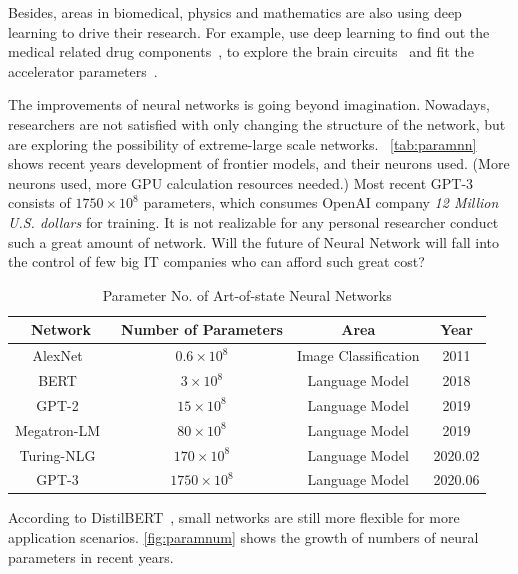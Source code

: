 \begin{spacing}{1.5}
Besides, areas in biomedical, physics and mathematics are also using deep learning to drive their research. For example, use deep learning to find out the medical related drug components~\cite{ma2015deep}, to explore the brain circuits~\cite{helmstaedter2013connectomic} and fit the accelerator parameters~\cite{ciodaro2012online}.

The improvements of neural networks is going beyond imagination. Nowadays, researchers are not satisfied with only changing the structure of the network, but are exploring the possibility of extreme-large scale networks. ~\autoref{tab:paramnn} shows recent years development of frontier models, and their neurons used. (More neurons used, more GPU calculation resources needed.) Most recent GPT-3 consists of $1750 \times {10}^8$ parameters, which consumes OpenAI company \textit{12 Million U.S. dollars} for training. It is not realizable for any personal researcher conduct such a great amount of network. Will the future of Neural Network will fall into the 
control of few big IT companies who can afford such great cost?

\begin{table}[ht]
\caption{Parameter No. of Art-of-state Neural Networks}
\label{tab:paramnn}
\begin{tabular}{cccc}
\toprule
\textbf{Network} & \textbf{Number of Parameters} & \textbf{Area}        & \textbf{Year} \\ \midrule
AlexNet~\cite{krizhevsky2012imagenet}     & $0.6 \times {10}^{8}$ & Image Classification & 2011     \\
BERT~\cite{Jacob2018BERT}        & $3 \times {10}^{8}$   & Language Model       & 2018     \\
GPT-2~\cite{radford2019language}       & $15 \times {10}^{8}$  & Language Model       & 2019     \\
Megatron-LM~\cite{Shoebi2019MegatronLM} & $80 \times {10}^{8}$  & Language Model       & 2019     \\
Turing-NLG~\cite{tnlg}  & $170 \times {10}^{8}$ & Language Model       & 2020.02 \\
GPT-3~\cite{brown2020language}       & $1750 \times {10}^{8}$  & Language Model       & 2020.06 \\ \bottomrule
\end{tabular}
\end{table}

According to DistilBERT~\cite{sanh2019distilbert}, small networks are still more flexible for more application scenarios. \autoref{fig:paramnum} shows the growth of numbers of neural parameters in recent years.


\end{spacing}
